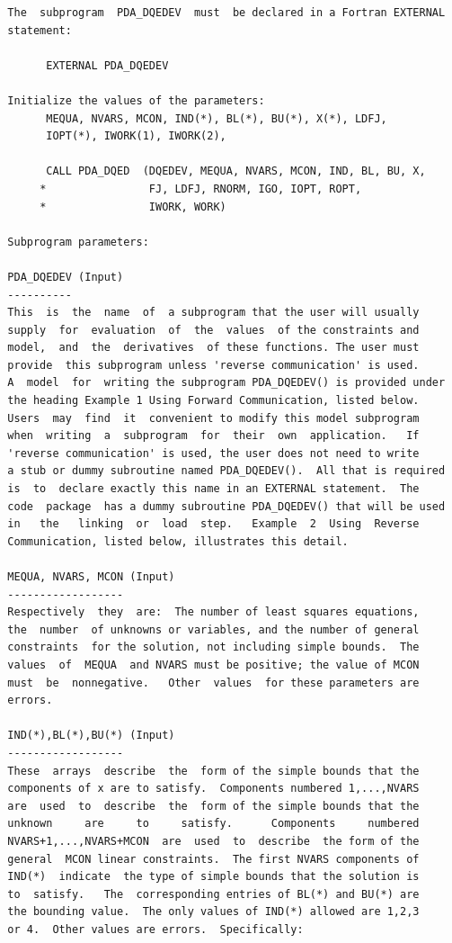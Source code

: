 \documentclass[11pt,twoside]{article}
\begin{document}
\begin{verbatim}
  The  subprogram  PDA_DQEDEV  must  be declared in a Fortran EXTERNAL
  statement:

        EXTERNAL PDA_DQEDEV

  Initialize the values of the parameters:
        MEQUA, NVARS, MCON, IND(*), BL(*), BU(*), X(*), LDFJ,
        IOPT(*), IWORK(1), IWORK(2),

        CALL PDA_DQED  (DQEDEV, MEQUA, NVARS, MCON, IND, BL, BU, X,
       *                FJ, LDFJ, RNORM, IGO, IOPT, ROPT,
       *                IWORK, WORK)

  Subprogram parameters:

  PDA_DQEDEV (Input)
  ----------
  This  is  the  name  of  a subprogram that the user will usually
  supply  for  evaluation  of  the  values  of the constraints and
  model,  and  the  derivatives  of these functions. The user must
  provide  this subprogram unless 'reverse communication' is used.
  A  model  for  writing the subprogram PDA_DQEDEV() is provided under
  the heading Example 1 Using Forward Communication, listed below.
  Users  may  find  it  convenient to modify this model subprogram
  when  writing  a  subprogram  for  their  own  application.   If
  'reverse communication' is used, the user does not need to write
  a stub or dummy subroutine named PDA_DQEDEV().  All that is required
  is  to  declare exactly this name in an EXTERNAL statement.  The
  code  package  has a dummy subroutine PDA_DQEDEV() that will be used
  in   the   linking  or  load  step.   Example  2  Using  Reverse
  Communication, listed below, illustrates this detail.

  MEQUA, NVARS, MCON (Input)
  ------------------
  Respectively  they  are:  The number of least squares equations,
  the  number  of unknowns or variables, and the number of general
  constraints  for the solution, not including simple bounds.  The
  values  of  MEQUA  and NVARS must be positive; the value of MCON
  must  be  nonnegative.   Other  values  for these parameters are
  errors.

  IND(*),BL(*),BU(*) (Input)
  ------------------
  These  arrays  describe  the  form of the simple bounds that the
  components of x are to satisfy.  Components numbered 1,...,NVARS
  are  used  to  describe  the  form of the simple bounds that the
  unknown     are     to     satisfy.      Components     numbered
  NVARS+1,...,NVARS+MCON  are  used  to  describe  the form of the
  general  MCON linear constraints.  The first NVARS components of
  IND(*)  indicate  the type of simple bounds that the solution is
  to  satisfy.   The  corresponding entries of BL(*) and BU(*) are
  the bounding value.  The only values of IND(*) allowed are 1,2,3
  or 4.  Other values are errors.  Specifically:


\end{verbatim}
\end{document}
